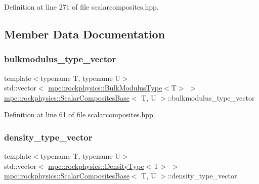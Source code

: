 Definition at line 271 of file scalarcomposites.\+hpp.



\subsection{Member Data Documentation}
\mbox{\label{classmpc_1_1rockphysics_1_1_scalar_composites_base_ade366a52f2f7d29a24d3ff200aa968f4}} 
\subsubsection{\texorpdfstring{bulkmodulus\+\_\+type\+\_\+vector}{bulkmodulus\_type\_vector}}
{\footnotesize\ttfamily template$<$typename T, typename U$>$ \\
std\+::vector$<$ \mbox{\hyperlink{structmpc_1_1rockphysics_1_1_bulk_modulus_type}{mpc\+::rockphysics\+::\+Bulk\+Modulus\+Type}}$<$T$>$ $>$ \mbox{\hyperlink{classmpc_1_1rockphysics_1_1_scalar_composites_base}{mpc\+::rockphysics\+::\+Scalar\+Composites\+Base}}$<$ T, U $>$\+::bulkmodulus\+\_\+type\+\_\+vector\hspace{0.3cm}{\ttfamily [protected]}}



Definition at line 61 of file scalarcomposites.\+hpp.

\mbox{\label{classmpc_1_1rockphysics_1_1_scalar_composites_base_a42b8687558e57e8c9e8548a7041107a9}} 
\subsubsection{\texorpdfstring{density\+\_\+type\+\_\+vector}{density\_type\_vector}}
{\footnotesize\ttfamily template$<$typename T, typename U$>$ \\
std\+::vector$<$ \mbox{\hyperlink{structmpc_1_1rockphysics_1_1_density_type}{mpc\+::rockphysics\+::\+Density\+Type}}$<$T$>$ $>$ \mbox{\hyperlink{classmpc_1_1rockphysics_1_1_scalar_composites_base}{mpc\+::rockphysics\+::\+Scalar\+Composites\+Base}}$<$ T, U $>$\+::density\+\_\+type\+\_\+vector\hspace{0.3cm}{\ttfamily [protected]}}



